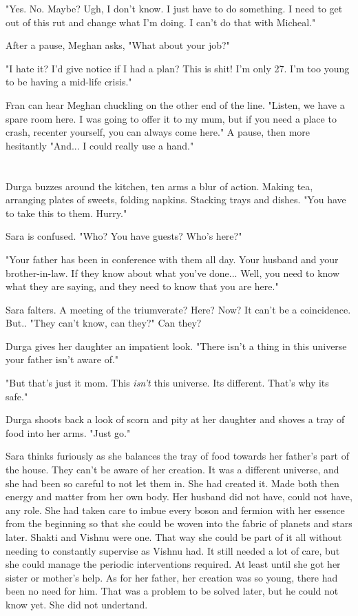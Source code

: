 \documentclass{article}
\begin{document}
"Yes. No. Maybe? Ugh, I don't know. I just have to do something. I need to get out of this rut and change what I'm doing. I can't do that with Micheal."

After a pause, Meghan asks, "What about your job?"

"I hate it? I'd give notice if I had a plan? This is shit! I'm only 27. I'm too young to be having a mid-life crisis." 

Fran can hear Meghan chuckling on the other end of the line. "Listen, we have a spare room here. I was going to offer it to my mum, but if you need a place to crash, recenter yourself, you can always come here." A pause, then more hesitantly "And... I could really use a hand."

\section{}
Durga buzzes around the kitchen, ten arms a blur of action. Making tea, arranging plates of sweets, folding napkins. Stacking trays and dishes. "You have to take this to them. Hurry."

Sara is confused. "Who? You have guests? Who's here?"

"Your father has been in conference with them all day. Your husband and your brother-in-law. If they know about what you've done... Well, you need to know what they are saying, and they need to know that you are here."

Sara falters. A meeting of the triumverate? Here? Now? It can't be a coincidence. But.. "They can't know, can they?" Can they?

Durga gives her daughter an impatient look. "There isn't a thing in this universe your father isn't aware of."

"But that's just it mom. This \emph{isn't} this universe. Its different. That's why its safe."

Durga shoots back a look of scorn and pity at her daughter and shoves a tray of food into her arms. "Just go."

Sara thinks furiously as she balances the tray of food towards her father's part of the house. They can't be aware of her creation. It was a different universe, and she had been so careful to not let them in. She had created it. Made both then energy and matter from her own body. Her husband did not have, could not have, any role. She had taken care to imbue every boson and fermion with her essence from the beginning so that she could be woven into the fabric of planets and stars later. Shakti and Vishnu were one. That way she could be part of it all without needing to constantly supervise as Vishnu had. It still needed a lot of care, but she could manage the periodic interventions required. At least until she got her sister or mother's help. As for her father, her creation was so young, there had been no need for him. That was a problem to be solved later, but he could not know yet. She did not undertand. 
\end{document}
